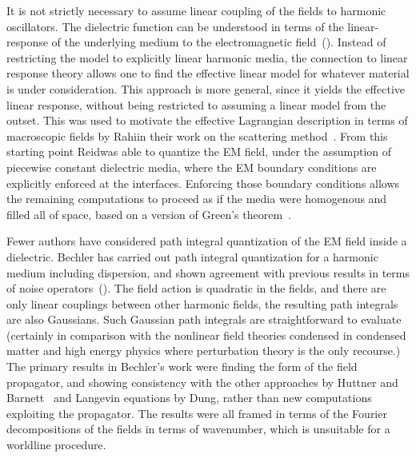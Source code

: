 It is not strictly necessary to assume linear coupling of the fields to harmonic oscillators. 
The dielectric function can be understood in terms of the linear-response of the underlying 
medium to the electromagnetic field~(\cite{Altland2011}).
Instead of restricting the model to explicitly linear harmonic media, the connection to linear response
theory allows one to find the effective linear model for whatever material is under consideration.
This approach is more general, since it yields the effective linear response, 
without being restricted to assuming a linear model from the outset.  This was used to 
motivate the effective Lagrangian description in terms of macroscopic fields by Rahi\etal in their 
work on the scattering method~\cite{Rahi2009}.    From this starting point Reid\etal was able to 
quantize the EM field, under the assumption of piecewise constant dielectric media, where the EM
boundary conditions are explicitly enforced at the interfaces.
Enforcing those boundary conditions allows the remaining computations to proceed
 as if the media were homogenous and filled all of space, based on a version of Green's theorem~\cite{Emig2004}.

Fewer authors have considered path integral quantization of the EM field inside a dielectric.
Bechler has carried out path integral quantization for a harmonic medium 
including dispersion, and shown agreement with previous results in terms 
of noise operators~(\cite{Bechler1999,Bechler2006}).  
The field action is quadratic in the fields, and there are only linear couplings between other
harmonic fields, the resulting path integrals are also Gaussians.  Such Gaussian path integrals 
are straightforward to evaluate (certainly in comparison with the nonlinear field theories condensed
in condensed matter and high energy physics where perturbation theory is the only recourse.)
The primary results in Bechler's work were finding the form of the field propagator, and showing consistency with the 
other approaches by Huttner and Barnett~\cite{Huttner1992} and Langevin equations by Dung\etal\cite{Dung1998},
 rather than new computations exploiting the propagator.    The results were all framed in terms of the 
Fourier decompositions of the fields in terms of wavenumber, which is unsuitable for a worldline procedure.

